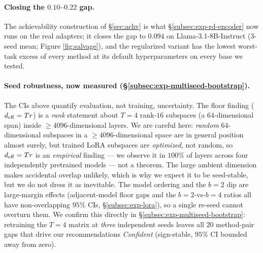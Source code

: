 \paragraph{Closing the $0.10$--$0.22$ gap.} The achievability
construction of \S\ref{sec:achv} is what
\S\ref{subsec:exp-rd-encoder} now runs on the real adapters; it
closes the gap to $0.094$ on Llama-3.1-8B-Instruct ($3$-seed mean;
Figure \ref{fig:salvage}), and the regularized variant has the lowest
worst-task excess of every method at its default hyperparameters on
every base we tested.

\paragraph{Seed robustness, now measured
(\S\ref{subsec:exp-multiseed-bootstrap}).} The CIs above quantify
evaluation, not training, uncertainty. The
floor finding ($d_{\mathrm{eff}} = Tr$) is a \emph{rank} statement about
$T=4$ rank-$16$ subspaces (a $64$-dimensional span) inside
$\geq 4096$-dimensional layers. We are careful here: \emph{random}
$64$-dimensional subspaces in a $\geq 4096$-dimensional space are in
general position almost surely, but trained LoRA subspaces are
\emph{optimized}, not random, so $d_{\mathrm{eff}} = Tr$ is an \emph{empirical}
finding --- we observe it in $100\%$ of layers across four
independently pretrained models --- not a theorem. The large ambient
dimension makes accidental overlap unlikely, which is why we expect it
to be seed-stable, but we do not dress it as inevitable. The model ordering and the $b=2$ dip are
large-margin effects (adjacent-model floor gaps and the
$b{=}2$-vs-$b{=}4$ ratios all have non-overlapping $95\%$ CIs,
\S\ref{subsec:exp-lora}), so a single re-seed cannot overturn them.
We confirm this directly in \S\ref{subsec:exp-multiseed-bootstrap}:
retraining the $T=4$ matrix at \emph{three} independent seeds leaves
all $20$ method-pair gaps that drive our recommendations
\emph{Confident} (sign-stable, $95\%$ CI bounded away from zero).

